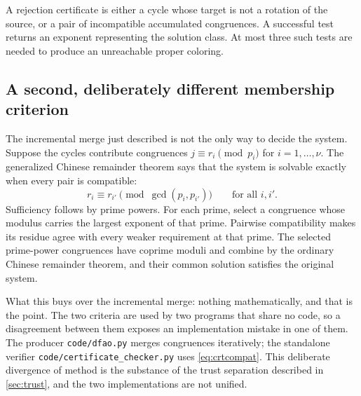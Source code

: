 \documentclass[11pt,a4paper]{article}
\numberwithin{equation}{section}
\theoremstyle{definition}
\theoremstyle{remark}
\begin{document}
A rejection certificate is either a cycle whose target is not a rotation of
the source, or a pair of incompatible accumulated congruences. A successful
test returns an exponent representing the solution class. At most three such
tests are needed to produce an unreachable proper coloring.

\subsection{A second, deliberately different membership
criterion}\label{sec:crtpairwise}

The incremental merge just described is not the only way to decide the
system. Suppose the cycles contribute congruences
$j\equiv r_i\pmod{p_i}$ for $i=1,\ldots,\nu$. The generalized Chinese
remainder theorem says that the system is solvable exactly when every pair is
compatible:
\begin{equation}\label{eq:crtcompat}
 r_i\equiv r_{i'}\pmod{\gcd(p_i,p_{i'})}\qquad\text{for all }i,i'.
\end{equation}
Sufficiency follows by prime powers. For each prime, select a congruence
whose modulus carries the largest exponent of that prime. Pairwise
compatibility makes its residue agree with every weaker requirement at that
prime. The selected prime-power congruences have coprime moduli and combine
by the ordinary Chinese remainder theorem, and their common solution
satisfies the original system.

What this buys over the incremental merge: nothing mathematically, and that
is the point. The two criteria are used by two programs that share no code,
so a disagreement between them exposes an implementation mistake in one of
them. The producer \texttt{code/dfao.py} merges congruences iteratively; the
standalone verifier \texttt{code/certificate\_checker.py} uses
\eqref{eq:crtcompat}. This deliberate divergence of method is the substance
of the trust separation described in \cref{sec:trust}, and the two
implementations are not unified.
\end{document}
